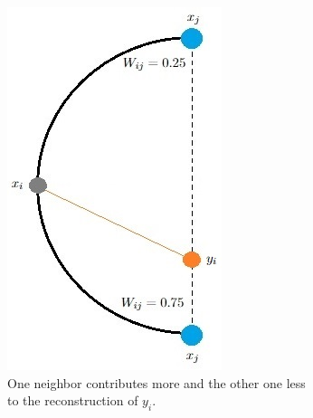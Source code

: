 \begin{figure}[!]
\begin{subfigure}[t]{0.40\textwidth}
         \includegraphics[width=\textwidth]{images/lle_0.75_0.25.jpg}
         \caption{One neighbor contributes more and the other one less to the reconstruction of \textcolor{embedding}{$y_i$}.}
         \label{subfig:lle_0.75_0.25}
     \end{subfigure}
     \hfill
     \begin{subfigure}[t]{0.40\textwidth}
         \centering

\end{subfigure}
\end{figure}
